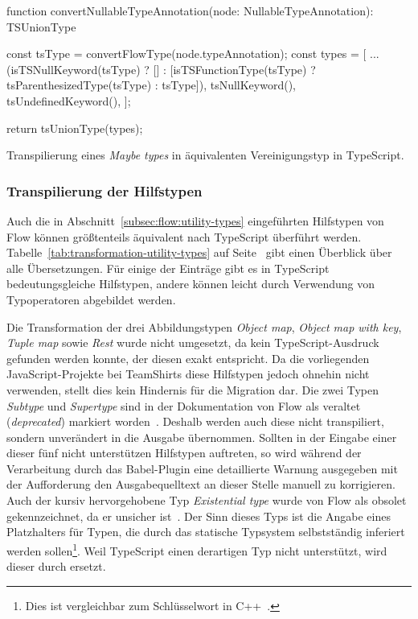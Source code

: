 {\bigbreak
\begin{listing}[htb]
\begin{textcode}
function convertNullableTypeAnnotation(node: NullableTypeAnnotation): TSUnionType {
  const tsType = convertFlowType(node.typeAnnotation);
  const types = [
    ...(isTSNullKeyword(tsType)
      ? []
      : [isTSFunctionType(tsType) ? tsParenthesizedType(tsType) : tsType]),
    tsNullKeyword(),
    tsUndefinedKeyword(),
  ];

  return tsUnionType(types);
}
\end{textcode}
\listingvspace
\caption{Transpilierung eines \textit{Maybe types} in äquivalenten Vereinigungstyp in TypeScript.}
\label{code:convert-nullable-type}
\end{listing}

\subsubsection{Transpilierung der Hilfstypen}

Auch die in Abschnitt~\ref{subsec:flow:utility-types} eingeführten Hilfstypen von Flow können größtenteils äquivalent nach TypeScript überführt werden. Tabelle~\ref{tab:transformation-utility-types} auf Seite~\pageref{tab:transformation-utility-types} gibt einen Überblick über alle Übersetzungen. Für einige der Einträge gibt es in TypeScript bedeutungsgleiche Hilfstypen, andere können leicht durch Verwendung von Typoperatoren abgebildet werden.

Die Transformation der drei Abbildungstypen \textit{Object map}, \textit{Object map with key}, \textit{Tuple map} sowie \textit{Rest} wurde nicht umgesetzt, da kein TypeScript-Ausdruck gefunden werden konnte, der diesen exakt entspricht. Da die vorliegenden JavaScript-Projekte bei TeamShirts diese Hilfstypen jedoch ohnehin nicht verwenden, stellt dies kein Hindernis für die Migration dar. Die zwei Typen \textit{Subtype} und \textit{Supertype} sind in der Dokumentation von Flow als veraltet (\textit{deprecated}) markiert worden~\autocite{FLOW:UTILITY_TYPES}. Deshalb werden auch diese nicht transpiliert, sondern unverändert in die Ausgabe übernommen. Sollten in der Eingabe einer dieser fünf nicht unterstützen Hilfstypen auftreten, so wird während der Verarbeitung durch das Babel-Plugin eine detaillierte Warnung ausgegeben mit der Aufforderung den Ausgabequelltext an dieser Stelle manuell zu korrigieren. Auch der kursiv hervorgehobene Typ \textit{Existential type} wurde von Flow als obsolet gekennzeichnet, da er unsicher ist~\autocite{FLOW:LINT_RULE_REFERENCE}. Der Sinn dieses Typs ist die Angabe eines Platzhalters für Typen, die durch das statische Typsystem selbstständig inferiert werden sollen\footnote{Dies ist vergleichbar zum Schlüsselwort  in C++~\autocite[151]{CPP11_SPEC}.}. Weil TypeScript einen derartigen Typ nicht unterstützt, wird dieser durch  ersetzt.

}
